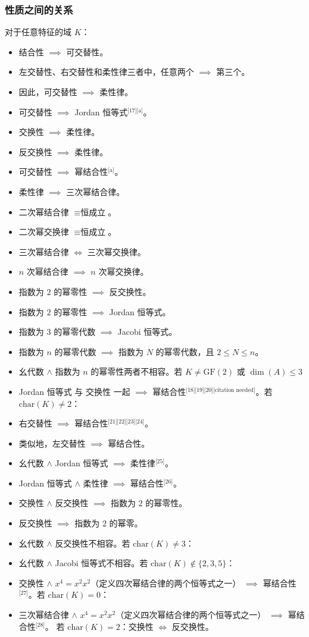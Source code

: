 \subsubsection{性质之间的关系}
对于任意特征的域 $K$：

\begin{itemize}
\item 结合性 $\implies$ 可交替性。
\item 左交替性、右交替性和柔性律三者中，任意两个 $\implies$ 第三个。
\item 因此，可交替性 $\implies$ 柔性律。
\item 可交替性 $\implies$ Jordan 恒等式\(^\text{[17][a]}\)。
\item 交换性 $\implies$ 柔性律。
\item 反交换性 $\implies$ 柔性律。
\item 可交替性 $\implies$ 幂结合性\(^\text{[a]}\)。
\item 柔性律 $\implies$ 三次幂结合律。
\item 二次幂结合律 $\equiv \text{恒成立}$。
\item 二次幂交换律 $\equiv \text{恒成立}$。
\item 三次幂结合律 $\iff$ 三次幂交换律。
\item $n$ 次幂结合律 $\implies$ $n$ 次幂交换律。
\item 指数为 $2$ 的幂零性 $\implies$ 反交换性。
\item 指数为 $2$ 的幂零性 $\implies$ Jordan 恒等式。
\item 指数为 $3$ 的幂零代数 $\implies$ Jacobi 恒等式。
\item 指数为 $n$ 的幂零代数 $\implies$ 指数为 $N$ 的幂零代数，且 $2 \leq N \leq n$。
\item 幺代数 $\wedge$ 指数为 $n$ 的幂零性两者不相容。若 $K \neq \mathrm{GF}(2)$ 或 $\dim(A) \leq 3$
\item Jordan 恒等式 与 交换性 一起 $\implies$ 幂结合性\(^\text{[18][19][20][citation needed]}\)。若 $\mathrm{char}(K) \neq 2$：
\item 右交替性 $\implies$ 幂结合性\(^\text{[21][22][23][24]}\)。
\item 类似地，左交替性 $\implies$ 幂结合性。
\item 幺代数 $\wedge$ Jordan 恒等式 $\implies$ 柔性律\(^\text{[25]}\)。
\item Jordan 恒等式 $\wedge$ 柔性律 $\implies$ 幂结合性\(^\text{[26]}\)。
\item 交换性 $\wedge$ 反交换性 $\implies$ 指数为 $2$ 的幂零性。
\item 反交换性 $\implies$ 指数为 $2$ 的幂零。
\item 幺代数 $\wedge$ 反交换性不相容。若 $\mathrm{char}(K) \neq 3$：
\item 幺代数 $\wedge$ Jacobi 恒等式不相容。若 $\mathrm{char}(K) \notin \{2,3,5\}$：
\item 交换性 $\wedge$ $x^4 = x^2x^2$（定义四次幂结合律的两个恒等式之一） $\implies$ 幂结合性\(^\text{[27]}\)。若 $\mathrm{char}(K) = 0$：
\item 三次幂结合律 $\wedge$ $x^4 = x^2x^2$（定义四次幂结合律的两个恒等式之一） $\implies$ 幂结合性\(^\text{[28]}\)。
若 $\mathrm{char}(K) = 2$：交换性 $\iff$ 反交换性。
\end{itemize}
